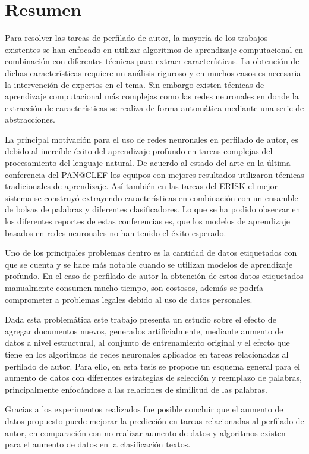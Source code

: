 \chapter{Resumen}

Para resolver las tareas de perfilado de autor, la mayoría de los trabajos existentes se han enfocado en utilizar algoritmos de aprendizaje computacional en combinación con diferentes técnicas para extraer características. La obtención de dichas características requiere un análisis riguroso y en muchos casos es necesaria la intervención de expertos en el tema. Sin embargo existen técnicas de aprendizaje computacional más complejas como las redes neuronales en donde la extracción de características se realiza de forma automática mediante una serie de abstracciones.

La principal motivación para el uso de redes neuronales en perfilado de autor, es debido al increíble éxito del aprendizaje profundo en tareas complejas del procesamiento del  lenguaje natural. De acuerdo al estado del arte en la última conferencia del PAN@CLEF los equipos con mejores resultados utilizaron técnicas tradicionales de aprendizaje. Así también en las tareas del ERISK el mejor sistema se construyó extrayendo características en combinación con un ensamble de bolsas de palabras y diferentes clasificadores. Lo que se ha podido observar en los diferentes reportes de estas conferencias es, que los modelos de aprendizaje basados en redes neuronales no han tenido el éxito esperado. 

Uno de los principales problemas dentro es la cantidad de datos etiquetados con que se cuenta y se hace más notable cuando se utilizan modelos de aprendizaje profundo. En el caso de perfilado de autor la obtención de estos datos etiquetados manualmente consumen mucho tiempo, son costosos, además se podría comprometer a problemas legales debido al uso de datos personales. 

Dada esta problemática este trabajo presenta un estudio sobre el efecto de agregar documentos nuevos, generados artificialmente, mediante aumento de datos a nivel estructural, al  conjunto de entrenamiento original y el efecto que tiene en los algoritmos de redes neuronales aplicados en tareas relacionadas al perfilado de autor. Para ello, en esta tesis se propone un esquema general para el aumento de datos con diferentes estrategias de selección y reemplazo de palabras, principalmente enfocándose a las relaciones de similitud de las palabras. 

Gracias a los experimentos realizados fue posible concluir que el aumento de datos propuesto puede mejorar la predicción en tareas relacionadas al perfilado de autor, en comparación con no realizar aumento de datos y algoritmos existen para el aumento de datos en la clasificación textos.

